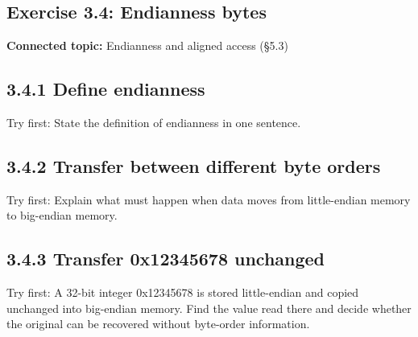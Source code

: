 \documentclass[11pt]{article}
\begin{document}
\begin{keepsection}
\section{Exercise 3.4: Endianness bytes}

\textbf{Connected topic:} Endianness and aligned access (§5.3)

\begin{keepsection}
\subsection{3.4.1 Define endianness}

Try first: State the definition of endianness in one sentence.

\end{keepsection}

\begin{keepsection}
\subsection{3.4.2 Transfer between different byte orders}

Try first: Explain what must happen when data moves from little-endian memory to big-endian memory.

\end{keepsection}

\begin{keepsection}
\subsection{3.4.3 Transfer 0x12345678 unchanged}

Try first: A 32-bit integer 0x12345678 is stored little-endian and copied unchanged into big-endian memory. Find the value read there and decide whether the original can be recovered without byte-order information.

\end{keepsection}
\end{keepsection}
\end{document}
